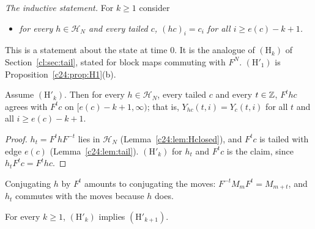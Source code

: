 \emph{The inductive statement.} For $k\ge1$ consider
\begin{itemize}
\item[$(\mathrm H'_k)$] \emph{for every $h\in\mathcal H_N$ and every tailed $c$, $(hc)_i=c_i$ for all $i\ge e(c)-k+1$.}
\end{itemize}
This is a statement about the state at time $0$. It is the analogue of $(\mathrm H_k)$ of Section~\ref{cl:sec:tail}, stated for block maps commuting with $F^N$. $(\mathrm H'_1)$ is Proposition~\ref{c24:prop:H1}(b).

\begin{lemma}\label{c24:lem:alltimes}
Assume $(\mathrm H'_k)$. Then for every $h\in\mathcal H_N$, every tailed $c$ and every $t\in\mathbb{Z}$, $F^thc$ agrees with $F^tc$ on $[e(c)-k+1,\infty)$; that is, $Y_{hc}(t,i)=Y_c(t,i)$ for all $t$ and all $i\ge e(c)-k+1$.
\end{lemma}

\begin{proof}
$h_t=F^thF^{-t}$ lies in $\mathcal H_N$ (Lemma~\ref{c24:lem:Hclosed}), and $F^tc$ is tailed with edge $e(c)$ (Lemma~\ref{c24:lem:tail}). $(\mathrm H'_k)$ for $h_t$ and $F^tc$ is the claim, since $h_tF^tc=F^thc$.
\end{proof}

Conjugating $h$ by $F^t$ amounts to conjugating the moves: $F^{-t}M_mF^t=M_{m+t}$, and $h_t$ commutes with the moves because $h$ does.

\begin{proposition}\label{c24:prop:step}
For every $k\ge1$, $(\mathrm H'_k)$ implies $(\mathrm H'_{k+1})$.
\end{proposition}

